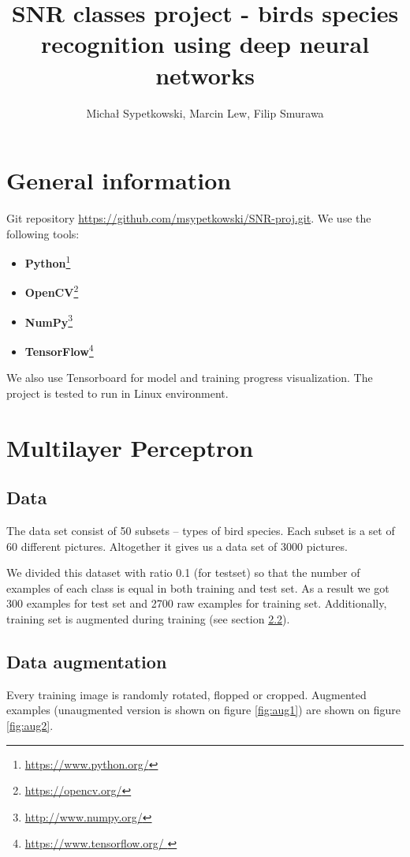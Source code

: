 \documentclass[a4paper]{article}
\begin{document}
\title{SNR classes project - birds species recognition using deep neural networks}

\author{Michał Sypetkowski, Marcin Lew, Filip Smurawa}
\maketitle

\section{General information}
Git repository \url{https://github.com/msypetkowski/SNR-proj.git}.
We use the following tools:
\begin{itemize}
    \item \textbf{Python}\footnote{\url{https://www.python.org/}}
    \item \textbf{OpenCV}\footnote{\url{https://opencv.org/}}
    \item \textbf{NumPy}\footnote{\url{http://www.numpy.org/}}
    \item \textbf{TensorFlow}\footnote{\url{https://www.tensorflow.org/ }}
\end{itemize}
We also use Tensorboard for model and training progress visualization.
The project is tested to run in Linux environment.

\section{Multilayer Perceptron}

\subsection{Data}
The data set consist of 50 subsets -- types of bird species.
Each subset is a set of 60 different pictures.
Altogether it gives us a data set of 3000 pictures.

We divided this dataset with ratio 0.1 (for testset)
so that the number of examples of each class is equal in both training and test set.
As a result we got 300 examples for test set and 2700 raw examples for training set.
Additionally, training set is augmented during training (see section \ref{augmentation}).


\subsection{Data augmentation}
\label{augmentation}
Every training image is randomly rotated, flopped or cropped. 
Augmented examples (unaugmented version is shown on figure \ref{fig:aug1})
are shown on figure \ref{fig:aug2}.
\end{document}
